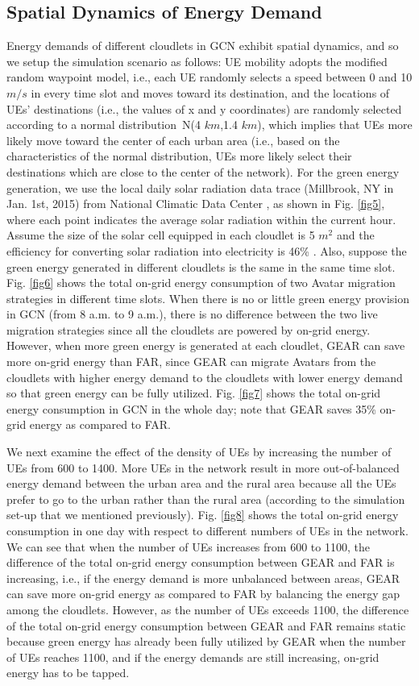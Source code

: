 \documentclass[journal,12pt,draftclsnofoot,onecolumn]{IEEEtran}
\begin{document}
\subsection{Spatial Dynamics of Energy Demand}
Energy demands of different cloudlets in GCN exhibit spatial dynamics, and so we setup the simulation scenario as follows: UE mobility adopts the modified random waypoint model, i.e., each UE randomly selects a speed between 0 and 10 $m/s$ in every time slot and moves toward its destination, and the locations of UEs' destinations (i.e., the values of x and y coordinates) are randomly selected according to a normal distribution~N(4 $km$,1.4 $km$), which implies that UEs more likely move toward the center of each urban area (i.e., based on the characteristics of the normal distribution, UEs more likely select their destinations which are close to the center of the network). For the green energy generation, we use the local daily solar radiation data trace (Millbrook, NY in Jan. 1st, 2015) from National Climatic Data Center \cite{26}, as shown in Fig. \ref{fig5}, where each point indicates the average solar radiation within the current hour. Assume the size of the solar cell equipped in each cloudlet is 5 $m^2$ and the efficiency for converting solar radiation into electricity is 46\% \cite{27}. Also, suppose the green energy generated in different cloudlets is the same in the same time slot. Fig. \ref{fig6} shows the total on-grid energy consumption of two Avatar migration strategies in different time slots. When there is no or little green energy provision in GCN (from 8 a.m. to 9 a.m.), there is no difference between the two live migration strategies since all the cloudlets are powered by on-grid energy. However, when more green energy is generated at each cloudlet, GEAR can save more on-grid energy than FAR, since GEAR can migrate Avatars from the cloudlets with higher energy demand to the cloudlets with lower energy demand so that green energy can be fully utilized. Fig. \ref{fig7} shows the total on-grid energy consumption in GCN in the whole day; note that GEAR saves 35\% on-grid energy as compared to FAR.\

We next examine the effect of the density of UEs by increasing the number of UEs from 600 to 1400. More UEs in the network result in more out-of-balanced energy demand between the urban area and the rural area because all the UEs prefer to go to the urban rather than the rural area (according to the simulation set-up that we mentioned previously). Fig. \ref{fig8} shows the total on-grid energy consumption in one day with respect to different numbers of UEs in the network. We can see that when the number of UEs increases from 600 to 1100, the difference of the total on-grid energy consumption between GEAR and FAR is increasing, i.e., if the energy demand is more unbalanced between areas, GEAR can save more on-grid energy as compared to FAR by balancing the energy gap among the cloudlets. However, as the number of UEs exceeds 1100, the difference of the total on-grid energy consumption between GEAR and FAR remains static because green energy has already been fully utilized by GEAR when the number of UEs reaches 1100, and if the energy demands are still increasing, on-grid energy has to be tapped.\
\end{document}
